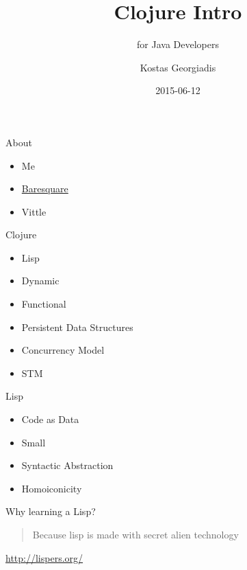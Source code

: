 \documentclass[10pt, compress]{beamer}
\title{Clojure Intro}
\subtitle{for Java Developers}
\date{2015-06-12}
\author{Kostas Georgiadis}
\institute{@kongeor kongeor@gmail.com}
\begin{document}
\maketitle

\begin{frame}{About}
  \begin{itemize}
    \item Me
    \item \href{http://www.bare-square.com/}{Baresquare}
    \item Vittle
  \end{itemize}
\end{frame}


\begin{frame}{Clojure}
  \begin{itemize}
    \item Lisp
    \item Dynamic
    \item Functional
    \item Persistent Data Structures
    \item Concurrency Model
    \item STM
  \end{itemize}
\end{frame}

\begin{frame}{Lisp}
  \begin{itemize}
    \item Code as Data
    \item Small
    \item Syntactic Abstraction
    \item Homoiconicity
  \end{itemize}
\end{frame}

\begin{frame}{Why learning a Lisp?}

  \begin{center}

    \begin{large}

      \begin{quote}
        Because lisp is made with secret alien technology
      \end{quote}

    \end{large}

    \url{http://lispers.org/}

  \end{center}

\end{frame}
\end{document}

